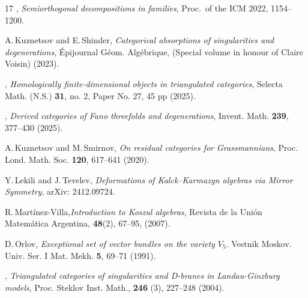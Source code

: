 \documentclass[a4paper,11pt, reqno]{amsart}
\theoremstyle{plain}
\theoremstyle{definition}
\numberwithin{equation}{section}
\begin{document}
\begin{thebibliography}{17}
 \bysame, \emph{Semiorthogonal decompositions in families}, Proc.~of the ICM 2022,
1154--1200.

A.\,Kuznetsov and E.\,Shinder,
{\it Categorical absorptions of singularities and degenerations}, 
\'{E}pijournal G\'{e}om. Alg\'{e}brique, (Special volume in
  honour of Claire Voisin) (2023).

\bysame,
{\it Homologically finite-dimensional objects in triangulated
categories}, Selecta Math. (N.S.) \textbf{31}, no. 2, Paper No. 27, 45 pp (2025).

\bysame, 
{\it Derived categories of Fano threefolds and degenerations}, 
Invent. Math. \textbf{239}, 377--430 (2025).

A.\,Kuznetsov and M.\,Smirnov, 
{\it On residual categories for Grassmannians}, 
Proc. Lond. Math. Soc. \textbf{120}, 617--641 (2020).



 Y.\,Lekili and J.\,Tevelev, {\it Deformations of Kalck--Karmazyn algebras via Mirror
Symmetry}, arXiv: 2412.09724.



R.\,Mart{\'i}nez-Villa,{\it Introduction to Koszul algebras}, Revista de la Uni{\'o}n Matem{\'a}tica Argentina, \textbf{48}(2), 67--95, (2007).

D.\,Orlov,
{\em Exceptional set of vector bundles on the variety {$V_5$}}.
\newblock  Vestnik Moskov. Univ. Ser. I Mat. Mekh. \textbf{5}, 69--71 (1991).

\bysame ,
{\it Triangulated categories of singularities and D-branes in Landau-Ginzburg models}, Proc. Steklov Inst. Math., \textbf{246} (3), 227--248 (2004).


\end{thebibliography}
\end{document}
